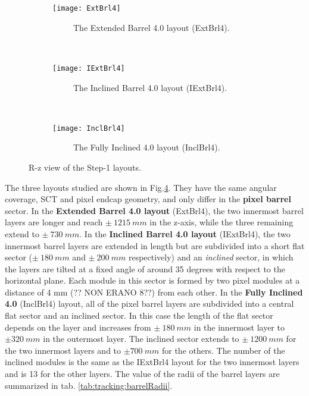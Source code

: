 \documentclass[a4paper,twoside,12pt]{article}
\begin{document}
\begin{figure}
\captionsetup[subfigure]{justification=centering}
\begin{subfigure}{\linewidth}
\centering
\texttt{[image: ExtBrl4]}
\caption{\ \ \ \ \ The Extended Barrel 4.0 layout (ExtBrl4).}
\label{fig:tracking:ExtBrl4}
\end{subfigure}\\[1ex]
\begin{subfigure}{\linewidth}
\centering
\texttt{[image: IExtBrl4]}
\caption{\ \ \ \ \ The Inclined Barrel 4.0 layout (IExtBrl4).}
\label{fig:tracking:IExtBrl4}
\end{subfigure}\\[1ex]
\begin{subfigure}{\linewidth}
\centering
\texttt{[image: InclBrl4]}
\caption{\ \ \ \ \ The Fully Inclined 4.0 layout (InclBrl4).}
\label{fig:tracking:InclBrl4}
\end{subfigure}
\caption{R-z view of the Step-1 layouts.}
\label{fig:tracking:layouts}
\end{figure}


The three layouts studied are shown in Fig.\ref{fig:tracking:layouts}. They have the same angular coverage, SCT and pixel endcap geometry, and only differ in the \textbf{pixel barrel} sector.
In the \textbf{Extended Barrel 4.0 layout} (ExtBrl4), the two innermost barrel layers are longer and
reach $\pm\ 1215\ mm$ in the z-axis, while the three remaining extend to $\pm\ 730\ mm$.
In the \textbf{Inclined Barrel 4.0 layout} (IExtBrl4), the two innermost barrel layers
are extended in length but are subdivided into a short flat sector ($\pm\ 180\ mm$ and $\pm\ 200\ mm$ respectively) and 
 an \textit{inclined} sector, in which the layers are tilted at a fixed angle of around 35 degrees with respect to the horizontal plane.
Each module in this sector is formed by two pixel modules at a distance of 4 mm (?? NON ERANO 8??) from each other. In the \textbf{Fully Inclined 4.0} (InclBrl4) layout,
all of the pixel barrel layers are subdivided into a central flat sector and an inclined sector. In this case the length of the flat sector depends
on the layer and increases from $\pm\ 180\ mm$ in the innermost layer to $\pm 320\ mm$ in the outermost layer. The inclined sector extends
to $\pm\ 1200\ mm$ for the two innermost layers and to $\pm 700\ mm$ for the others. The number of the inclined modules is the same as the IExtBrl4 layout for the two innermost
layers and is 13 for the other layers. The value of the radii of the barrel layers are summarized in 
tab. \ref{tab:tracking:barrelRadii}. \\
\end{document}
